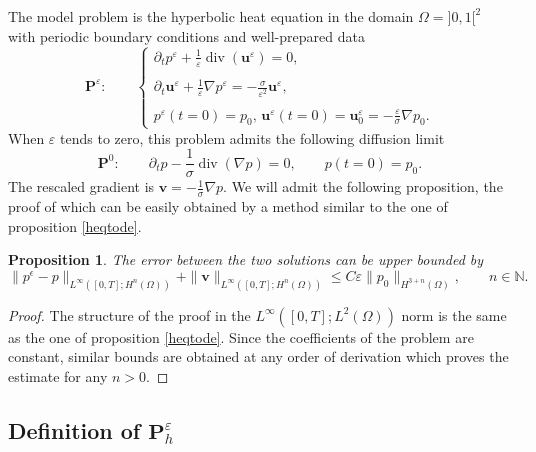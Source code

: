\documentclass[a4paper,french,english,10pt]{article}
\newcommand\uu{\mathbf{u}}
\newcommand\eps{\varepsilon}
\newcommand{\ds}{\displaystyle}
\newtheorem{proposition}[theorem]{Proposition}
\begin{document}
The model problem is the hyperbolic heat equation in the domain
$\Omega= ]0,1[^2$
with periodic boundary conditions and  well-prepared data
\begin{equation*}\label{HHE!}
\mathbf P^\eps: \qquad 
\left\{\begin{array}{l}
\ds\partial_t p^{\eps}+\frac{1}{\eps}\operatorname{div}(\uu^{\eps})=0,\\
\\
\ds\partial_t \uu^{\eps}+\frac{1}{\eps}\nabla
p^{\eps}=-\frac{\sigma}{\eps^2}\uu^{\eps},\\
\\
p^{\eps}(t=0)=p_0\mbox{,  }\uu^{\eps}(t=0)=\uu^{\eps}_0=
-\frac{\eps}\sigma
\nabla p_0.
 \end{array}\right.
\end{equation*}
When $\eps$ tends to zero,
this problem  admits the following diffusion  limit
\begin{equation*}\label{HHE!lim}
\mathbf P^0: \qquad
\ds\partial_t p-\frac{1}{\sigma}\operatorname{div}(\nabla{p})=0
, \qquad 
p(t=0)=p_0.  
\end{equation*}
The rescaled gradient is 
$
\mathbf v=-\frac{1}{\sigma} \nabla{p}$.
We will admit the following proposition, the proof of which can be easily obtained 
by a method similar to the one of proposition
\ref{heqtode}.

\begin{proposition}\label{heqtode2d}
The error between the two solutions
can be  upper bounded by
\begin{equation}\label{ine3}
\| p^\epsilon-p\|_{   L^\infty([0,T];H^n(\Omega))  }+
\| \mathbf{v} 
 \|_{   L^\infty([0,T]; H^n(\Omega))  }
 \leq
C \eps
\|p_0 \|_{H^{3+n}(\Omega)},
\qquad n \in \mathbb N.
\end{equation}
\end{proposition}
\begin{proof}
The structure of the 
proof in the $L^\infty( [0,T];L^2(\Omega))$ norm is the same as the one
of proposition \ref{heqtode}.
Since the coefficients of the problem are constant, similar bounds are obtained
at any order of derivation which proves the estimate for any $n>0$.
\end{proof}


\subsection{Definition of $\mathbf P_h^\eps$}
\end{document}
